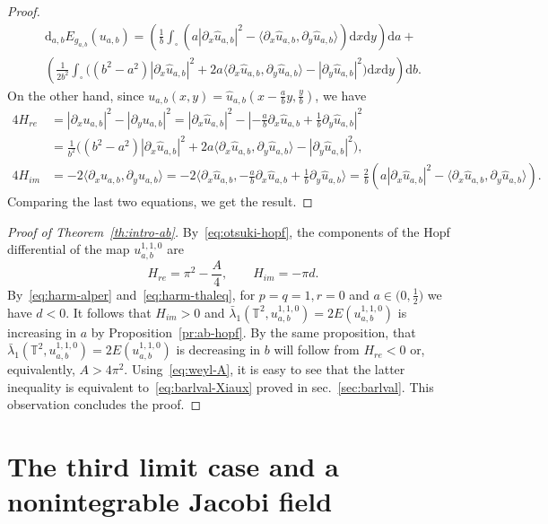 \documentclass{amsart}
\renewcommand{\d}{\mathrm{d}}
\theoremstyle{plain}
\theoremstyle{definition}
\theoremstyle{remark}
\begin{document}
\begin{proof}
\begin{multline*}
\d_{a,b}E_{g_{a,b}}(u_{a,b})=
\left(\frac{1}b\int_\square (a|\partial_x\hat u_{a,b}|^2-
\langle\partial_x\hat u_{a,b},\partial_y\hat u_{a,b}\rangle)\d x\d y\right)
\d a+\\
\left(\frac{1}{2b^2}\int_\square\bigl((b^2-a^2)|\partial_x\hat u_{a,b}|^2+2a
\langle\partial_x\hat u_{a,b},\partial_y\hat u_{a,b}\rangle-
|\partial_y\hat u_{a,b}|^2\bigr)\d x\d y\right)\d b.
\end{multline*}
On the other hand, since \(u_{a,b}(x,y)=\hat u_{a,b}(x-\frac{a}b y,\frac{y}b)\),
we have
\begin{align*}
4H_{re}&=|\partial_x u_{a,b}|^2-|\partial_y u_{a,b}|^2=
|\partial_x\hat u_{a,b}|^2-\left|-\frac{a}b\partial_x\hat u_{a,b}+\frac{1}b
\partial_y\hat u_{a,b}\right|^2\\&=
\frac{1}{b^2}\bigl((b^2-a^2)|\partial_x\hat u_{a,b}|^2+2a
\langle\partial_x\hat u_{a,b},\partial_y\hat u_{a,b}\rangle-
|\partial_y\hat u_{a,b}|^2\bigr),\\
4H_{im}&=-2\langle\partial_x u_{a,b},\partial_y u_{a,b}\rangle=
-2\langle\partial_x\hat u_{a,b},-\frac{a}b\partial_x\hat u_{a,b}+\frac{1}b
\partial_y\hat u_{a,b}\rangle=
\frac{2}b(a|\partial_x\hat u_{a,b}|^2-\langle\partial_x\hat u_{a,b},
\partial_y\hat u_{a,b}\rangle).
\end{align*}
Comparing the last two equations, we get the result.
\end{proof}

\begin{proof}[Proof of Theorem~\ref{th:intro-ab}]
By~\eqref{eq:otsuki-hopf}, the components of the Hopf differential of the map
\(u_{a,b}^{1,1,0}\) are
\[
H_{re}=\pi^2-\frac{A}4,\qquad H_{im}=-\pi d.
\]
By~\eqref{eq:harm-alper} and~\eqref{eq:harm-thaleq}, for \(p=q=1,r=0\) and
\(a\in\bigl(0,\frac{1}2\bigr)\) we have \(d<0\). It follows that \(H_{im}>0\)
and \(\bar\lambda_1(\mathbb T^2,u_{a,b}^{1,1,0})=2E(u_{a,b}^{1,1,0})\) is
increasing in \(a\) by Proposition~\ref{pr:ab-hopf}. By the same proposition,
that \(\bar\lambda_1(\mathbb T^2,u_{a,b}^{1,1,0})=2E(u_{a,b}^{1,1,0})\) is
decreasing in \(b\) will follow from \(H_{re}<0\) or, equivalently,
\(A>4\pi^2\). Using~\eqref{eq:weyl-A}, it is easy to see that the latter
inequality is equivalent to~\eqref{eq:barlval-Xiaux} proved in
sec.~\ref{sec:barlval}. This observation concludes the proof.
\end{proof}

\section{The third limit case and a nonintegrable Jacobi field}\label{sec:lim3}
\end{document}
